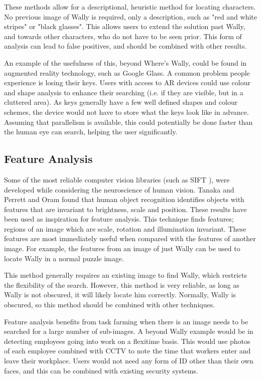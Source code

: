 \documentclass[../main.tex]{subfiles}
\begin{document}
    These methods allow for a descriptional, heuristic method for locating characters.
    No previous image of Wally is required, only a description, such as "red and white stripes" or "black glasses".
    This allows users to extend the solution past Wally, and towards other characters, who do not have to be seen prior.
    This form of analysis can lead to false positives, and should be combined with other results.

    An example of the usefulness of this, beyond Where's Wally, could be found in augmented reality technology, such as Google Glass.
    A common problem people experience is losing their keys.
    Users with access to AR devices could use colour and shape analysis to enhance their searching (i.e. if they are visible, but in a cluttered area).
    As keys generally have a few well defined shapes and colour schemes, the device would not have to store what the keys look like in advance.
    Assuming that parallelism is available, this could potentially be done faster than the human eye can search, helping the user significantly.
    
    \subsection{Feature Analysis}
    Some of the most reliable computer vision libraries (such as SIFT \cite{sift}), were developed while considering the neuroscience of human vision.
    Tanaka\cite{tanakahv} and Perrett and Oram\cite{perretthv} found that human object recognition identifies objects with features that are invariant to brightness, scale and position.
    These results have been used as inspiration for feature analysis.
    This technique finds features; regions of an image which are scale, rotation and illumination invariant.
    These features are most immediately useful when compared with the features of another image.
    For example, the features from an image of just Wally can be used to locate Wally in a normal puzzle image.

    This method generally requires an existing image to find Wally, which restricts the flexibility of the search.
    However, this method is very reliable, as long as Wally is not obscured, it will likely locate him correctly.
    Normally, Wally is obscured, so this method should be combined with other techniques.

    Feature analysis benefits from task farming when there is an image needs to be searched for a large number of sub-images.
    A beyond Wally example would be in detecting employees going into work on a flexitime basis.
    This would use photos of each employee combined with CCTV to note the time that workers enter and leave their workplace.
    Users would not need any form of ID other than their own faces, and this can be combined with existing security systems.    
\end{document}

